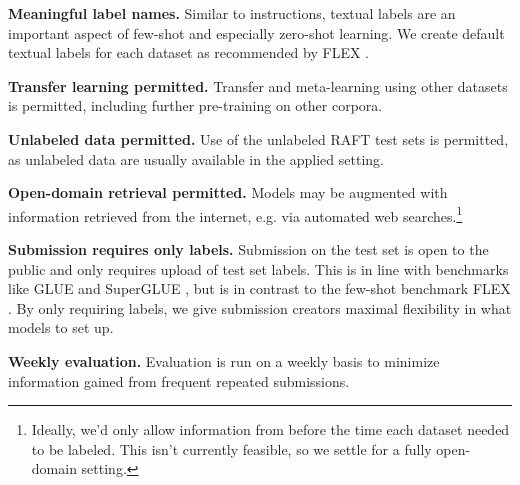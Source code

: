 \documentclass{article}
\newcommand{\name}{\textsc{RAFT}}
\begin{document}
\textbf{Meaningful label names.} Similar to instructions, textual labels are an important aspect of few-shot and especially zero-shot learning. We create default textual labels for each dataset as recommended by FLEX \citep{bragg2021flex}.

\textbf{Transfer learning permitted.} Transfer and meta-learning using other datasets is permitted, including further pre-training on other corpora.

\textbf{Unlabeled data permitted.} Use of the unlabeled \name{} test sets is permitted, as unlabeled data are usually available in the applied setting.

\textbf{Open-domain retrieval permitted.} Models may be augmented with information retrieved from the internet, e.g. via automated web searches.\footnote{Ideally, we'd only allow information from before the time each dataset needed to be labeled. This isn't currently feasible, so we settle for a fully open-domain setting.}

\textbf{Submission requires only labels.} Submission on the test set is open to the public and only requires upload of test set labels. This is in line with benchmarks like GLUE \citep{wang2019glue} and SuperGLUE \citep{wang2019superglue}, but is in contrast to the few-shot benchmark FLEX \citep{bragg2021flex}. By only requiring labels, we give submission creators maximal flexibility in what models to set up.

\textbf{Weekly evaluation.} Evaluation is run on a weekly basis to minimize information gained from frequent repeated submissions.
\end{document}
